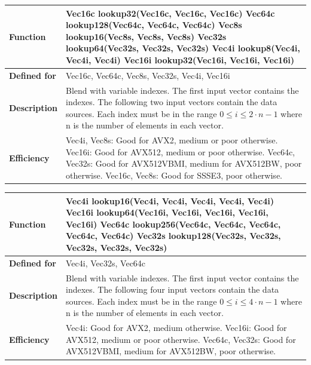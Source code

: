 \documentclass[vcl_manual.tex]{subfiles}
\begin{document}
\begin{tabular}{|p{30mm}|p{120mm}|}
\hline
\bfseries Function & 
Vec16c lookup32(Vec16c, Vec16c, Vec16c) \newline
Vec64c lookup128(Vec64c, Vec64c, Vec64c) \newline
Vec8s lookup16(Vec8s, Vec8s, Vec8s) \newline
Vec32s lookup64(Vec32s, Vec32s, Vec32s) \newline
Vec4i lookup8(Vec4i, Vec4i, Vec4i) \newline
Vec16i lookup32(Vec16i, Vec16i, Vec16i) \\ \hline
\bfseries Defined for & Vec16c, Vec64c, Vec8s, Vec32s, Vec4i, Vec16i \\ \hline
\bfseries Description & Blend with variable indexes. The first input vector contains the indexes. The following two input vectors contain the data sources. Each index must be in the range  $0 \leq i \leq 2\cdot n - 1$ where n is the number of elements in each vector. \\ \hline
\bfseries Efficiency & 
Vec4i, Vec8s: Good for AVX2, medium or poor otherwise. \newline
Vec16i: Good for AVX512, medium or poor otherwise. \newline
Vec64c, Vec32s: Good for AVX512VBMI, medium for AVX512BW, poor otherwise. \newline
Vec16c, Vec8s: Good for SSSE3, poor otherwise. \\ \hline
\end{tabular}


\begin{tabular}{|p{30mm}|p{120mm}|}
\hline
\bfseries Function & 
Vec4i lookup16(Vec4i, Vec4i, Vec4i, Vec4i, Vec4i) \newline
Vec16i lookup64(Vec16i, Vec16i, Vec16i, Vec16i, Vec16i) \newline
Vec64c lookup256(Vec64c, Vec64c, Vec64c, Vec64c, Vec64c) \newline
Vec32s lookup128(Vec32s, Vec32s, Vec32s, Vec32s, Vec32s) \\ \hline
\bfseries Defined for & Vec4i, Vec32s, Vec64c \\ \hline
\bfseries Description & Blend with variable indexes. The first input vector contains the indexes. The following four input vectors contain the data sources. Each index must be in the range  $0 \leq i \leq 4\cdot n - 1$ where n is the number of elements in each vector. \\ \hline
\bfseries Efficiency & 
Vec4i: Good for AVX2, medium otherwise. \newline
Vec16i: Good for AVX512, medium or poor otherwise. \newline
Vec64c, Vec32s: Good for AVX512VBMI, medium for AVX512BW, poor otherwise. 
\\ \hline
\end{tabular}
\end{document}
